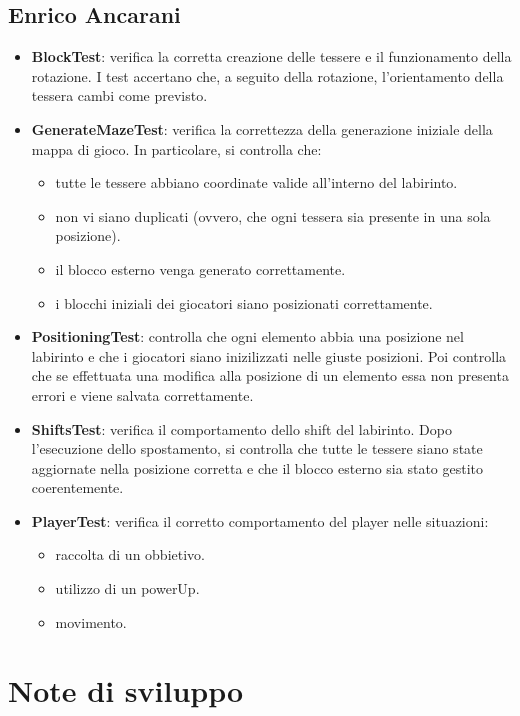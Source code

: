 \documentclass[a4paper,12pt]{report}
\begin{document}
\subsection{Enrico Ancarani}
\begin{itemize}
	\item \textbf{BlockTest}: verifica la corretta creazione delle tessere e il funzionamento della rotazione. I test accertano che, a seguito della rotazione, 
	l’orientamento della tessera cambi come previsto.
	\item \textbf{GenerateMazeTest}: verifica la correttezza della generazione iniziale della mappa di gioco. In particolare, si controlla che:
	\begin{itemize}
		\item tutte le tessere abbiano coordinate valide all’interno del labirinto.
		\item non vi siano duplicati (ovvero, che ogni tessera sia presente in una sola posizione).
		\item il blocco esterno venga generato correttamente.
		\item i blocchi iniziali dei giocatori siano posizionati correttamente.
	\end{itemize}
	\item \textbf{PositioningTest}: controlla che ogni elemento abbia una posizione nel labirinto e che i giocatori siano inizilizzati nelle giuste posizioni.
	Poi controlla che se effettuata una modifica alla posizione di un elemento essa non presenta errori e viene salvata correttamente.
	\item \textbf{ShiftsTest}: verifica il comportamento dello shift del labirinto. Dopo l’esecuzione dello spostamento, si controlla che 
	tutte le tessere siano state aggiornate nella posizione corretta e che il blocco esterno sia stato gestito coerentemente.
	\item \textbf{PlayerTest}: verifica il corretto comportamento del player nelle situazioni:
	\begin{itemize}
		\item raccolta di un obbietivo.
		\item utilizzo di un powerUp.
		\item movimento.
	\end{itemize}
\end{itemize}

\section{Note di sviluppo}
\end{document}
